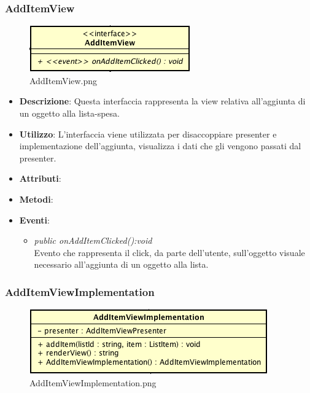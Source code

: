 \subsubsection{AddItemView}

\label{AddItemView}
\begin{figure}[ht]
	\centering
	\includegraphics[scale=0.5]{Sezioni/SottosezioniST/img/app/AddItemView.png}
	\caption{AddItemView.png}
\end{figure}

\begin{itemize}
\item \textbf{Descrizione}: Questa interfaccia rappresenta la view relativa all'aggiunta di un oggetto alla lista-spesa.
\item \textbf{Utilizzo}: L'interfaccia viene utilizzata per disaccoppiare presenter e implementazione dell'aggiunta, visualizza i dati che gli vengono passati dal presenter.
\item \textbf{Attributi}: 
\item \textbf{Metodi}:
\item \textbf{Eventi}:
	\begin{itemize}	
	\item \textit{public onAddItemClicked():void}\\
	Evento che rappresenta il click, da parte dell'utente, sull'oggetto visuale necessario all'aggiunta di un oggetto alla lista.
	\end{itemize}
\end{itemize}

\subsubsection{AddItemViewImplementation}

\label{AddItemViewImplementation}
\begin{figure}[ht]
	\centering
	\includegraphics[scale=0.5]{Sezioni/SottosezioniST/img/app/AddItemViewImplementation.png}
	\caption{AddItemViewImplementation.png}
\end{figure}

